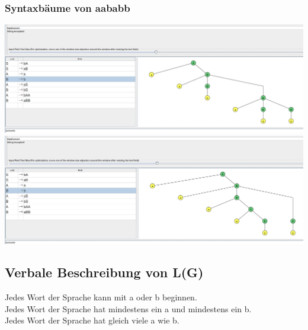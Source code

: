 \documentclass[a4paper,12pt,titlepage]{article}
\begin{document}
\subsubsection{Syntaxbäume von \glqq aababb\grqq}
\includegraphics[width=1.0\textwidth]{syntaxtree_task9_3.png}\\
\includegraphics[width=1.0\textwidth]{syntaxtree_task9_4.png}\\
\subsection{Verbale Beschreibung von L(G)}
Jedes Wort der Sprache kann mit a oder b beginnen.\\
Jedes Wort der Sprache hat mindestens ein a und mindestens ein b.\\
Jedes Wort der Sprache hat gleich viele a wie b.\\
\end{document}

